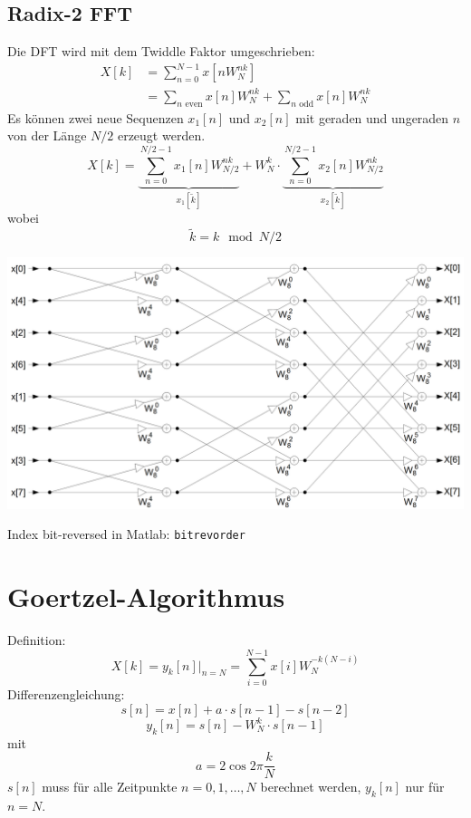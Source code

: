\subsection{Radix-2 FFT}
Die DFT wird mit dem Twiddle Faktor umgeschrieben:
\[\begin{aligned} X[k] &= \sum_{n=0}^{N-1} x[nW_N^{nk}]\\
	&= \sum_{n \textrm{ even}} x[n]W_N^{nk} + \sum_{n\textrm{ odd}}x[n]W_N^{nk}
\end{aligned}\]
Es können zwei neue Sequenzen $x_1[n]$ und $x_2[n]$ mit geraden und ungeraden
$n$ von der Länge $N/2$ erzeugt werden.
\[ X[k] = \underbrace{\sum_{n=0}^{N/2-1}x_1[n]W_{N/2}^{nk}}_{x_1[\tilde{k}]} +
	W_N^k\cdot \underbrace{\sum_{n=0}^{N/2-1} x_2[n]W_{N/2}^{nk}}_
	{{x_2[\tilde{k}]}} \]
wobei
\[ \tilde{k} = k\mod N/2 \]

\begin{center}
	\includegraphics[scale=.7]{./images/fft}
\end{center}

Index bit-reversed in Matlab: \verb|bitrevorder|

\section{Goertzel-Algorithmus}
Definition:
\[ X[k] = y_k[n]|_{n=N} = \sum_{i=0}^{N-1}x[i]W_N^{-k(N-i)} \]
Differenzengleichung:
\[ s[n] = x[n] + a \cdot s[n-1] - s[n-2] \]
\[ y_k[n] = s[n] - W_N^k \cdot s[n-1] \]
mit 
\[ a= 2\cos 2\pi\frac{k}{N} \]
$s[n]$ muss für alle Zeitpunkte $n=0,1,\ldots,N$ berechnet werden, $y_k[n]$
nur für $n=N$.

